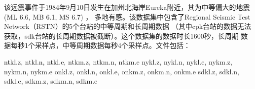 该远震事件于1984年9月10日发生在加州北海岸Eureka附近，其为中等偏大的地震(ML 6.6, MB 6.1, MS 6.7) ，
多地有感。该数据集中包含了Regional Seismic Test Network（RSTN）的5个台站的中等周期和长周期数据
（其中cpk台站的数据无法获取，sdk台站的长周期数据被截断）。这个数据集的数据时长1600秒，长周期
数据每秒1个采样点，中等周期数据每秒4个采样点。文件包括：
\begin{SACCode}
    ntkl.z, ntkl.n, ntkl.e, ntkm.z, ntkm.n, ntkm.e
    nykl.z, nykl.n, nykl.e, nykm.z, nykm.n, nykm.e
    onkl.z, onkl.n, onkl.e, onkm.z, onkm.n, onkm.e
    sdkl.z, sdkl.n, sdkl.e, sdkm.z, sdkm.n, sdkm.e
\end{SACCode}
